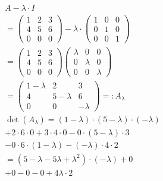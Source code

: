 \begin{align*}
    A - \lambda \cdot I                                                      \\
    = \begin{pmatrix}
          1 & 2 & 3 \\
          4 & 5 & 6 \\
          0 & 0 & 0
      \end{pmatrix} - \lambda \cdot \begin{pmatrix}
                                        1 & 0 & 0 \\
                                        0 & 1 & 0 \\
                                        0 & 0 & 1
                                    \end{pmatrix}                           \\
    = \begin{pmatrix}
          1 & 2 & 3 \\
          4 & 5 & 6 \\
          0 & 0 & 0
      \end{pmatrix}\begin{pmatrix}
                       \lambda & 0       & 0       \\
                       0       & \lambda & 0       \\
                       0       & 0       & \lambda
                   \end{pmatrix}                               \\
    = \begin{pmatrix}
          1 - \lambda & 2           & 3        \\
          4           & 5 - \lambda & 6        \\
          0           & 0           & -\lambda
      \end{pmatrix} =: A_\lambda                                   \\
    \det(A_\lambda) = (1 - \lambda) \cdot (5 - \lambda) \cdot (-\lambda)     \\
    + 2 \cdot 6 \cdot 0  + 3 \cdot 4 \cdot 0 - 0 \cdot (5 - \lambda) \cdot 3 \\
    - 0 \cdot 6 \cdot (1 - \lambda) - (-\lambda) \cdot 4 \cdot 2             \\
    = (5 - \lambda - 5\lambda + \lambda^2) \cdot (-\lambda) + 0              \\
    + 0 - 0 - 0 + 4\lambda \cdot 2                                           \\

\end{align*}

